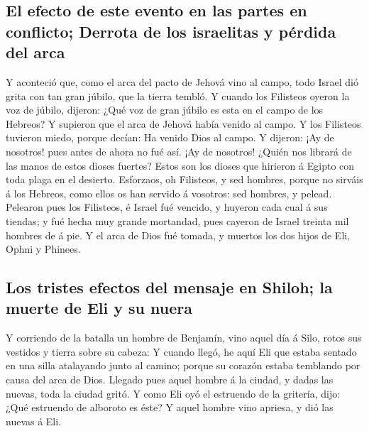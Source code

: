 \hypertarget{el-efecto-de-este-evento-en-las-partes-en-conflicto-derrota-de-los-israelitas-y-puxe9rdida-del-arca}{%
\subsection{El efecto de este evento en las partes en conflicto; Derrota
de los israelitas y pérdida del
arca}\label{el-efecto-de-este-evento-en-las-partes-en-conflicto-derrota-de-los-israelitas-y-puxe9rdida-del-arca}}

 Y aconteció que, como el arca del pacto de Jehová vino al
campo, todo Israel dió grita con tan gran júbilo, que la tierra tembló.
 Y cuando los Filisteos oyeron la voz de júbilo, dijeron:
¿Qué voz de gran júbilo es esta en el campo de los Hebreos? Y supieron
que el arca de Jehová había venido al campo.  Y los
Filisteos tuvieron miedo, porque decían: Ha venido Dios al campo. Y
dijeron: ¡Ay de nosotros! pues antes de ahora no fué así. 
¡Ay de nosotros! ¿Quién nos librará de las manos de estos dioses
fuertes? Estos son los dioses que hirieron á Egipto con toda plaga en el
desierto.  Esforzaos, oh Filisteos, y sed hombres, porque
no sirváis á los Hebreos, como ellos os han servido á vosotros: sed
hombres, y pelead.  Pelearon pues los Filisteos, é Israel
fué vencido, y huyeron cada cual á sus tiendas; y fué hecha muy grande
mortandad, pues cayeron de Israel treinta mil hombres de á pie.
 Y el arca de Dios fué tomada, y muertos los dos hijos de
Eli, Ophni y Phinees.

\hypertarget{los-tristes-efectos-del-mensaje-en-shiloh-la-muerte-de-eli-y-su-nuera}{%
\subsection{Los tristes efectos del mensaje en Shiloh; la muerte de Eli
y su
nuera}\label{los-tristes-efectos-del-mensaje-en-shiloh-la-muerte-de-eli-y-su-nuera}}

 Y corriendo de la batalla un hombre de Benjamín, vino
aquel día á Silo, rotos sus vestidos y tierra sobre su cabeza:
 Y cuando llegó, he aquí Eli que estaba sentado en una
silla atalayando junto al camino; porque su corazón estaba temblando por
causa del arca de Dios. Llegado pues aquel hombre á la ciudad, y dadas
las nuevas, toda la ciudad gritó.  Y como Eli oyó el
estruendo de la gritería, dijo: ¿Qué estruendo de alboroto es éste? Y
aquel hombre vino apriesa, y dió las nuevas á Eli.

